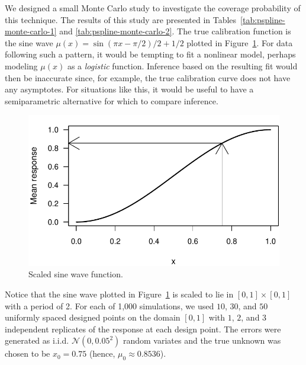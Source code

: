 \documentclass[cmfont,usenames,dvipsnames,leqno]{afit-etd}\usepackage[]{graphicx}\usepackage[]{color}
\makeatletter
\def\maxwidth{ %
  \ifdim\Gin@nat@width>\linewidth
    \linewidth
  \else
    \Gin@nat@width
  \fi
}
\newenvironment{knitrout}{}{} %
\renewenvironment{knitrout}{\begin{singlespace}}{\end{singlespace}}
\newcommand{\mc}[1]{\ensuremath{\mathcal{#1}}}
\makeatother
\begin{document}
We designed a small Monte Carlo study to investigate the coverage probability of this technique. The results of this study are presented in Tables~\ref{tab:pspline-monte-carlo-1} and \ref{tab:pspline-monte-carlo-2}. The true calibration function is the sine wave $\mu(x) = \sin(\pi x - \pi/2)/2 + 1/2$ plotted in Figure~\ref{fig:sine-wave}. For data following such a pattern, it would be tempting to fit a nonlinear model, perhaps modeling $\mu(x)$ as a \textit{logistic} function. Inference based on the resulting fit would then be inaccurate since, for example, the true calibration curve does not have any asymptotes. For situations like this, it would be useful to have a semiparametric alternative for which to compare inference.

\begin{knitrout}
\color{fgcolor}\begin{figure}[H]

\includegraphics[width=\maxwidth]{figure/sine-wave} \caption[Scaled sine wave function]{Scaled sine wave function.\label{fig:sine-wave}}
\end{figure}


\end{knitrout}


Notice that the sine wave plotted in Figure~\ref{fig:sine-wave} is scaled to lie in $[0, 1] \times [0, 1]$ with a period of 2. For each of 1,000 simulations, we used $10$, $30$, and $50$ uniformly spaced designed points on the domain $[0, 1]$ with $1$, $2$, and $3$ independent replicates of the response at each design point. The errors were generated as i.i.d. $\mc{N}(0, 0.05^2)$ random variates and the true unknown was chosen to be $x_0 = 0.75$ (hence, $\mu_0 \approx 0.8536$).
\end{document}
